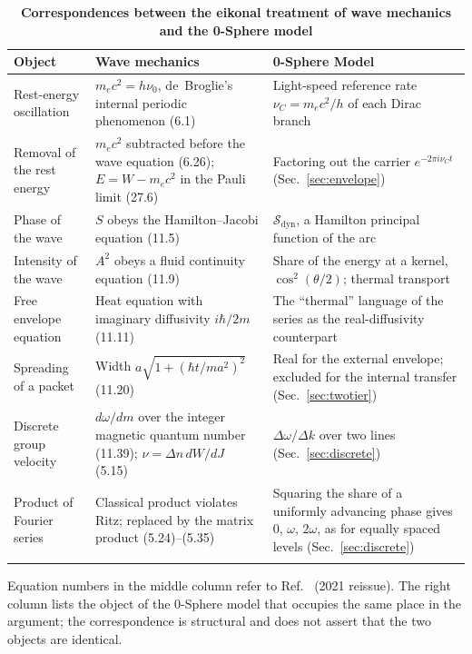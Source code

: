 \documentclass[%
 reprint, amsmath,amssymb, aps, prb, ]{revtex4-2}
\numberwithin{equation}{section}
\newcommand{\iphase}{\theta}  %
\newcommand{\Sdyn}{\mathcal{S}_{\mathrm{dyn}}}
\begin{document}
\begin{table}[t!]
\centering
\caption{\textbf{Correspondences between the eikonal treatment of wave mechanics and the 0-Sphere model}}
\label{tab:yukawa}
\renewcommand{\arraystretch}{1.4}
\begin{tabular}{p{4.2cm}p{5.6cm}p{5.7cm}}
\toprule
\textbf{Object} & \textbf{Wave mechanics~\cite{Yukawa1954}} & \textbf{0-Sphere Model} \\
\midrule
\raggedright Rest-energy oscillation
& \raggedright $m_ec^2 = h\nu_0$, de~Broglie's internal periodic phenomenon (6.1)
& \raggedright Light-speed reference rate $\nu_C = m_ec^2/h$ of each Dirac branch~\cite{H51, H65} \tabularnewline
\addlinespace[0.3cm]
\raggedright Removal of the rest energy
& \raggedright $m_ec^2$ subtracted before the wave equation (6.26); $E = W - m_ec^2$ in the Pauli limit (27.6)
& \raggedright Factoring out the carrier $e^{-2\pi i\nu_C t}$ (Sec.~\ref{sec:envelope}) \tabularnewline
\addlinespace[0.3cm]
\raggedright Phase of the wave
& \raggedright $S$ obeys the Hamilton--Jacobi equation (11.5)
& \raggedright $\Sdyn$, a Hamilton principal function of the arc~\cite{H51} \tabularnewline
\addlinespace[0.3cm]
\raggedright Intensity of the wave
& \raggedright $A^2$ obeys a fluid continuity equation (11.9)
& \raggedright Share of the energy at a kernel, $\cos^2(\iphase/2)$; thermal transport \tabularnewline
\addlinespace[0.3cm]
\raggedright Free envelope equation
& \raggedright Heat equation with imaginary diffusivity $i\hbar/2m$ (11.11)
& \raggedright The ``thermal'' language of the series as the real-diffusivity counterpart \tabularnewline
\addlinespace[0.3cm]
\raggedright Spreading of a packet
& \raggedright Width $a\sqrt{1 + (\hbar t/ma^2)^2}$ (11.20)
& \raggedright Real for the external envelope; excluded for the internal transfer (Sec.~\ref{sec:twotier}) \tabularnewline
\addlinespace[0.3cm]
\raggedright Discrete group velocity
& \raggedright $d\omega/dm$ over the integer magnetic quantum number (11.39); $\nu = \Delta n\,dW/dJ$ (5.15)
& \raggedright $\Delta\omega/\Delta k$ over two lines~\cite{H66} (Sec.~\ref{sec:discrete}) \tabularnewline
\addlinespace[0.3cm]
\raggedright Product of Fourier series
& \raggedright Classical product violates Ritz; replaced by the matrix product (5.24)--(5.35)
& \raggedright Squaring the share of a uniformly advancing phase gives $0$, $\omega$, $2\omega$, as for equally spaced levels (Sec.~\ref{sec:discrete}) \tabularnewline
\addlinespace[0.2cm]
\bottomrule
\end{tabular}
\vspace{0.2cm}
\begin{minipage}{0.95\textwidth}
\justifying\footnotesize
Equation numbers in the middle column refer to Ref.~\cite{Yukawa1954} (2021 reissue). The right column lists the object of the 0-Sphere model that occupies the same place in the argument; the correspondence is structural and does not assert that the two objects are identical.
\end{minipage}
\end{table}
\end{document}
